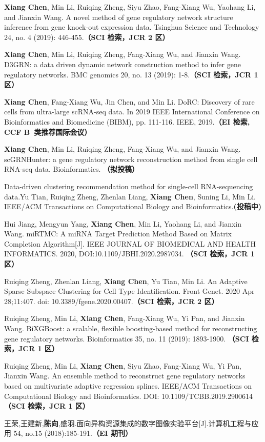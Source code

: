\else
\begin{enumerate}[label={[\arabic*]},itemindent=2em,wide]

\item \textbf{Xiang Chen}, Min Li, Ruiqing Zheng, Siyu Zhao, Fang-Xiang Wu, Yaohang Li, and Jianxin Wang. A novel method of gene regulatory network structure inference from gene knock-out expression data. Tsinghua Science and Technology 24, no. 4 (2019): 446-455.{\bfseries \heiti（SCI 检索，JCR 2 区）} 
\item \textbf{Xiang Chen}, Min Li, Ruiqing Zheng, Fang-Xiang Wu, and Jianxin Wang. D3GRN: a data driven dynamic network construction method to infer gene regulatory networks. BMC genomics 20, no. 13 (2019): 1-8.{\bfseries \heiti（SCI 检索，JCR 1 区）} 
\item \textbf{Xiang Chen}, Fang-Xiang Wu, Jin Chen, and Min Li. DoRC: Discovery of rare cells from ultra-large scRNA-seq data. In 2019 IEEE International Conference on Bioinformatics and Biomedicine (BIBM), pp. 111-116. IEEE, 2019.{\bfseries \heiti（EI 检索, CCF B~类推荐国际会议）}
\item \textbf{Xiang Chen}, Min Li, Ruiqing Zheng, Fang-Xiang Wu, and Jianxin Wang. scGRNHunter: a gene regulatory network reconstruction method from single cell RNA-seq data. Bioinformatics. {\bfseries \heiti（拟投稿）}
\item Data-driven clustering recommendation method for single-cell RNA-sequencing data.Yu Tian, Ruiqing Zheng, Zhenlan Liang, {\bf Xiang Chen}, Suning Li, Min Li. IEEE/ACM Transactions on Computational Biology and Bioinformatics.{\bfseries \heiti(投稿中)}
\item Hui Jiang, Mengyun Yang, \textbf{Xiang Chen}, Min Li, Yaohang Li, and Jianxin Wang. miRTMC: A miRNA Target Prediction Method Based on Matrix Completion Algorithm[J]. IEEE JOURNAL OF BIOMEDICAL AND HEALTH INFORMATICS. 2020, DOI:10.1109/JBHI.2020.2987034. {\bfseries \heiti（SCI 检索，JCR 1 区）}
\item Ruiqing Zheng, Zhenlan Liang, \textbf{Xiang Chen}, Yu Tian, Min Li. An Adaptive Sparse Subspace Clustering for Cell Type Identification. Front Genet. 2020 Apr 28;11:407. doi: 10.3389/fgene.2020.00407.{\bfseries \heiti（SCI 检索，JCR 2 区）}
\item Ruiqing Zheng, Min Li, \textbf{Xiang Chen}, Fang-Xiang Wu, Yi Pan, and Jianxin Wang. BiXGBoost: a scalable, flexible boosting-based method for reconstructing gene regulatory networks. Bioinformatics 35, no. 11 (2019): 1893-1900. {\bfseries \heiti（SCI 检索，JCR 1 区）}
\item Ruiqing Zheng, Min Li, \textbf{Xiang Chen}, Siyu Zhao, Fang-Xiang Wu, Yi Pan, Jianxin Wang. An ensemble method to reconstruct gene regulatory networks based on multivariate adaptive regression splines. IEEE/ACM Transactions on Computational Biology and Bioinformatics. DOI: 10.1109/TCBB.2019.2900614  {\bfseries \heiti（SCI 检索，JCR 1 区）}

\item 王荣,王建新,\textbf{陈向},盛羽.面向异构资源集成的数字图像实验平台[J].计算机工程与应用 54, no.15 (2018):185-191.{\bfseries \heiti（EI 期刊）}
\end{enumerate}
\fi

